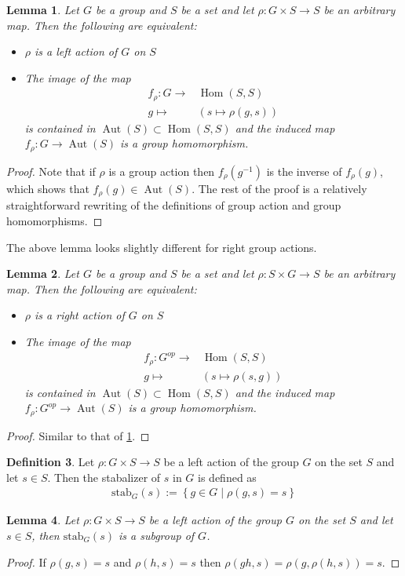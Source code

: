 \documentclass[a4paper,12pt,reqno]{amsart}
\newcommand{\set}[1]{\left\lbrace #1 \right\rbrace}
\newcommand{\stab}[2]{\text{stab}_{#1}(#2)}
\DeclareMathOperator{\Hom}{Hom}
\DeclareMathOperator{\Aut}{Aut}
\newtheorem{lemma}{Lemma}
\theoremstyle{definition}
\newtheorem{definition}[lemma]{Definition}
\numberwithin{lemma}{section}
\numberwithin{equation}{section}
\numberwithin{figure}{section}
\begin{document}
\begin{lemma}\label{stmt:left-group-action-is-group-hom}
Let $G$ be a group and $S$ be a set and let $\rho : G \times S \to S$ be an arbitrary map. Then the following are equivalent:
\begin{itemize}
	\item $\rho$ is a left action of $G$ on $S$
	\item The image of the map\begin{align*}
	f_\rho : G \to& \Hom(S,S)\\
	g \mapsto& (s\mapsto \rho(g,s))
	\end{align*} is contained in $\Aut(S) \subset \Hom(S,S)$ and the induced map $f_\rho : G \to \Aut(S)$ is a group homomorphism.
\end{itemize}
\end{lemma}
\begin{proof}
Note that if $\rho$ is a group action then $f_\rho(g^{-1})$ is the inverse of $f_\rho(g)$, which shows that $f_\rho(g) \in \Aut(S)$. The rest of the proof is a relatively straightforward rewriting of the definitions of group action and group homomorphisms.	%
\end{proof}


The above lemma looks slightly different for right group actions.
\begin{lemma}\label{stmt:right-group-action-is-oppositie-group-hom}
	Let $G$ be a group and $S$ be a set and let $\rho : S \times G \to S$ be an arbitrary map. Then the following are equivalent:
	\begin{itemize}
		\item $\rho$ is a right action of $G$ on $S$
		\item The image of the map\begin{align*}
		f_\rho : G^{op} \to& \Hom(S,S)\\
		g \mapsto& (s\mapsto \rho(s,g))
		\end{align*} is contained in $\Aut(S) \subset \Hom(S,S)$ and the induced map $f_\rho : G^{op} \to \Aut(S)$ is a group homomorphism.
	\end{itemize}
\end{lemma}
\begin{proof}
	Similar to that of \cref{stmt:left-group-action-is-group-hom}.
\end{proof}

\begin{definition}\label{def:stabilizer}
Let $\rho:  G \times S \to S$ be a left action of the group $G$ on the set $S$ and let $s \in S$. Then the stabalizer of $s$ in  $G$ is defined as \begin{align*}
\stab{G}{s} := \set{ g \in G \mid \rho(g,s)=s}
\end{align*}
\end{definition}
\begin{lemma}
Let $\rho: G \times S \to S$ be a left action of the group $G$ on the set $S$ and let $s \in S$, then $\stab{G}{s}$ is a subgroup of $G$.
\end{lemma}
\begin{proof}
If $\rho(g,s)=s$ and $\rho(h,s)=s$ then $\rho(gh,s)=\rho(g,\rho(h,s))=s$.
\end{proof}
\end{document}
